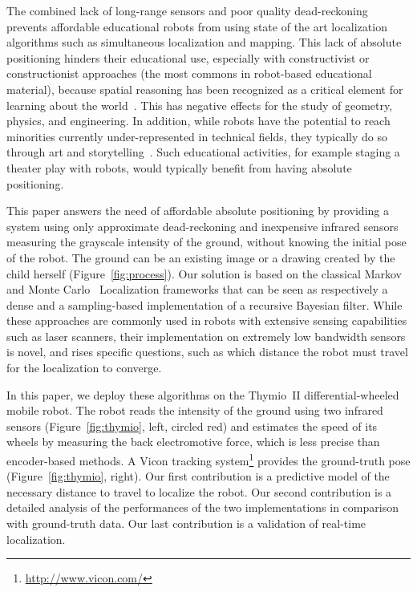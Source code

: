 \documentclass[letterpaper, 10pt, conference]{ieeeconf}
\newcommand{\fig}[1]{Figure~\ref{fig:#1}}
\begin{document}
The combined lack of long-range sensors and poor quality dead-reckoning prevents affordable educational robots from using state of the art localization algorithms such as simultaneous localization and mapping.
This lack of absolute positioning hinders their educational use, especially with constructivist or constructionist approaches (the most commons in robot-based educational material), because spatial reasoning has been recognized as a critical element for learning about the world~\cite{lesh2003beyond}.
This has negative effects for the study of geometry, physics, and engineering.
In addition, while robots have the potential to reach minorities currently under-represented in technical fields, they typically do so through art and storytelling~\cite{szecsei2015girls}.
Such educational activities, for example staging a theater play with robots, would typically benefit from having absolute positioning.

This paper answers the need of affordable absolute positioning by providing a system using only approximate dead-reckoning and inexpensive infrared sensors measuring the grayscale intensity of the ground, without knowing the initial pose of the robot.
The ground can be an existing image or a drawing created by the child herself (\fig{process}).
Our solution is based on the classical Markov~\cite{fox1999markov} and Monte Carlo~\cite{dellaert1999monte} Localization frameworks that can be seen as respectively a dense and a sampling-based implementation of a recursive Bayesian filter.
While these approaches are commonly used in robots with extensive sensing capabilities such as laser scanners, their implementation on extremely low bandwidth sensors is novel, and rises specific questions, such as which distance the robot must travel for the localization to converge.

In this paper, we deploy these algorithms on the Thymio~II differential-wheeled mobile robot.
The robot reads the intensity of the ground using two infrared sensors (\fig{thymio}, left, circled red) and estimates the speed of its wheels by measuring the back electromotive force, which is less precise than encoder-based methods.
A Vicon tracking system\footnote{\url{http://www.vicon.com/}} provides the ground-truth pose (\fig{thymio}, right).
Our first contribution is a predictive model of the necessary distance to travel to localize the robot.
Our second contribution is a detailed analysis of the performances of the two implementations in comparison with ground-truth data.
Our last contribution is a validation of real-time localization.
\end{document}
